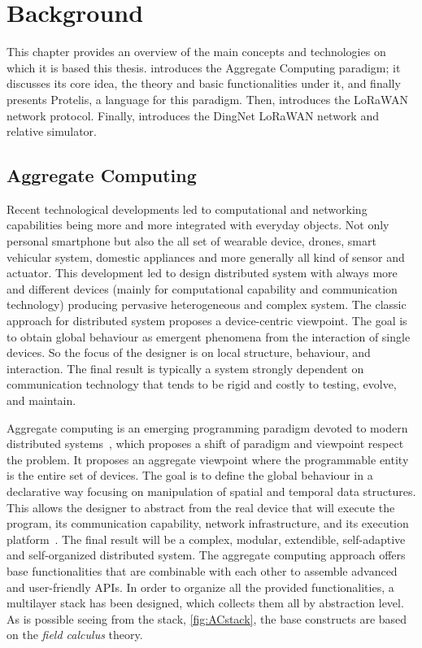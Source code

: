 \chapter{Background}
\label{chap:background}
This chapter provides an overview of the main concepts and technologies on which it is based this thesis.  introduces the Aggregate Computing paradigm; it discusses its core idea, the theory and basic functionalities under it, and finally presents Protelis, a language for this paradigm. 
Then,  introduces the LoRaWAN network protocol. 
Finally,  introduces the DingNet LoRaWAN network and relative simulator. 

\section{Aggregate Computing}
\label{sec:AC}
Recent technological developments led to computational and networking capabilities being more and more integrated with everyday objects. 
% 
Not only personal smartphone but also the all set of wearable device, drones, smart vehicular system, domestic appliances and more generally all kind of sensor and actuator.
% 
This development led to design distributed system with always more and different devices (mainly for computational capability and communication technology) producing pervasive heterogeneous and complex system.
% 
The classic approach for distributed system proposes a device-centric viewpoint.
% 
The goal is to obtain global behaviour as emergent phenomena from the interaction of single devices. 
% 
So the focus of the designer is on local structure, behaviour, and interaction. 
% 
The final result is typically a system strongly dependent on communication technology that tends to be rigid and costly to testing, evolve, and maintain.
 
Aggregate computing is an emerging programming paradigm devoted to modern distributed systems~\cite{BealIEEEComputer2015}, which proposes a shift of paradigm and viewpoint respect the problem. 
% 
It proposes an aggregate viewpoint where the programmable entity is the entire set of devices.
% 
The goal is to define the global behaviour in a declarative way focusing on manipulation of spatial and temporal data structures. This allows the designer to abstract from the real device that will execute the program, its communication capability, network infrastructure, and its execution platform~\cite{ViroliUbiComp2016}. 
% 
The final result will be a complex, modular, extendible, self-adaptive and self-organized distributed system.
% 
The aggregate computing approach offers base functionalities that are combinable with each other to assemble advanced and user-friendly APIs. In order to organize all the provided functionalities, a multilayer stack has been designed, which collects them all by abstraction level. 
As is possible seeing from the stack, \autoref{fig:ACstack}, the base constructs are based on the \textit{field calculus} theory.

